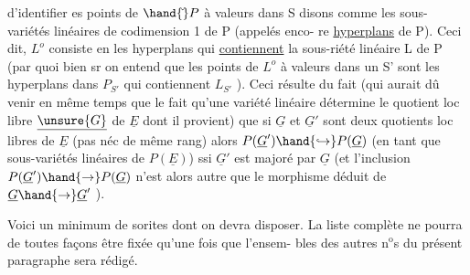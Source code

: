  

 d'identifier es points de $\hand{\check{}}P$\hand{,} à valeurs dans  S disons\hand{,}
comme les sous-variétés linéaires de codimension 1 de P (appelés enco-%
re \uline{hyperplans} de P). Ceci dit, $L^{o}$ consiste en les hyperplans qui
\uline{contiennent} la sous-riété linéaire L de P (par quoi bien sr on
entend que les points de $L^{o}$  à valeurs dans un S' sont les
hyperplans dans $P_{S'}$ qui contiennent $L_{S'}$ ). Ceci résulte du fait 
(qui aurait dû venir en même temps que le fait qu'une variété linéaire \hand{,}
détermine le quotient loc libre $\underline{\unsure{G}}$ de $\underline{E}$ dont il provient) que si
$\underline{G}$ et $\underline{G}'$ sont deux quotients loc libres de $\underline{E}$ (pas néc de même rang)
alors $P(\underline{G}')\hand{\hookrightarrow}P(\underline{G})$ (en tant que sous-variétés linéaires de $P(\underline{E})$) ssi
$\underline{G}'$ est majoré par $\underline{G}$ (et l'inclusion $P(\underline{G}')\hand{\rightarrow}P(\underline{G})$ n'est alors autre
que le morphisme déduit de $\underline{G}\hand{\rightarrow}\underline{G}'$ ).

Voici un minimum de sorites dont on devra disposer. La liste
complète ne pourra de toutes façons être fixée qu'une fois que l'ensem-%
bles des autres n$^{\text{o}}$s du présent paragraphe sera rédigé.

